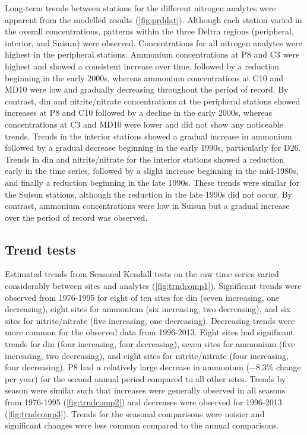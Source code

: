 \documentclass[letterpaper,12pt,oneside]{article}\usepackage[]{graphicx}\usepackage[]{color}
\begin{document}
Long-term trends between stations for the different nitrogen analytes were apparent from the modelled results (\cref{fig:prddat}).  Although each station varied in the overall concentrations, patterns within the three Deltra regions (peripheral, interior, and Suisun) were observed.  Concentrations for all nitrogen analytes were highest in the peripheral stations.  Ammonium concentrations at P8 and C3 were highest and showed a consistent increase over time, followed by a reduction beginning in the early 2000s, whereas ammonium concentrations at C10 and MD10 were low and gradually decreasing throughout the period of record.  By contrast, \ac{din} and nitrite/nitrate concentrations at the peripheral stations showed increases at  P8 and C10 followed by a decline in the early 2000s, whereas concentrations at C3 and MD10 were lower and did not show any noticeable trends.  Trends in the interior stations showed a gradual increase in ammonium followed by a gradual decrease beginning in the early 1990s, particularly for D26.  Trends in \ac{din} and nitrite/nitrate for the interior stations showed a reduction early in the time series, followed by a slight increase beginning in the mid-1980s, and finally a reduction beginning in the late 1990s.  These trends were similar for the Suisun stations, although the reduction in the late 1990s did not occur.  By contrast, ammonium concentrations were low in Suisun but a gradual increase over the period of record was observed.  

\subsection{Trend tests}



Estimated trends from Seasonal Kendall tests on the raw time series varied considerably between sites and analytes (\cref{fig:trndcomp1}). Significant trends were observed from 1976-1995 for eight of ten sites for \ac{din} (seven increasing, one decreasing), eight sites for ammonium (six increasing, two decreasing), and six sites for nitrite/nitrate (five increasing, one decreasing).  Decreasing trends were more common for the observed data from 1996-2013.  Eight sites had significant trends for \ac{din} (four increasing, four decreasing), seven sites for ammonium (five increasing, two decreasing), and eight sites for nitrite/nitrate (four increasing, four decreasing). P8 had a relatively large decrease in ammonium ($-8.3$\% change per year) for the second annual period compared to all other sites. Trends by season were similar such that increases were generally observed in all seasons from 1976-1995 (\cref{fig:trndcomp2}) and decreases were observed for 1996-2013 (\cref{fig:trndcomp3}).  Trends for the seasonal comparisons were noisier and significant changes were less common compared to the annual comparisons.
\end{document}
